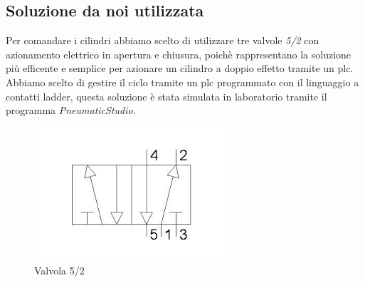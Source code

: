 \documentclass[12pt]{article}
\begin{document}
\subsection{Soluzione da noi utilizzata}
Per comandare i cilindri abbiamo scelto di utilizzare tre valvole \textit{5/2} con azionamento elettrico in apertura e chiusura, poichè rappresentano la soluzione più efficente e semplice per azionare un cilindro a doppio effetto tramite un plc.\\
\noindent
Abbiamo scelto di gestire il ciclo tramite un plc programmato con il linguaggio a contatti ladder, questa soluzione è stata simulata in laboratorio
tramite il programma \textit{PneumaticStudio}.\\
\begin{figure}[!h]
	\centering
	\includegraphics[scale=0.4]{52.png}
	\caption{Valvola 5/2}
	\label{fig:5/2}
\end{figure}
\end{document}
